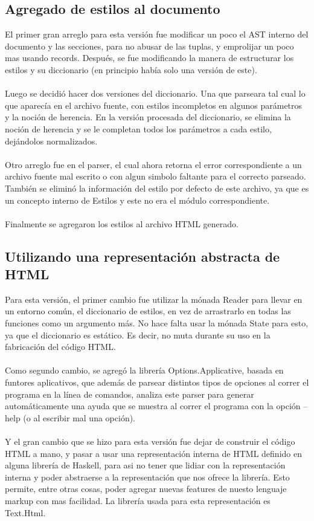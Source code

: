 \documentclass{article}
\begin{document}
\subsection{Agregado de estilos al documento}
El primer gran arreglo para esta versión fue modificar un poco el AST interno del documento y las secciones, para no abusar de las tuplas, y emprolijar un poco mas usando records. Después, se fue modificando la manera de estructurar los estilos y su diccionario (en principio había solo una versión de este).
\\~\\
Luego se decidió hacer dos versiones del diccionario. Una que parseara tal cual lo que aparecía en el archivo fuente, con estilos incompletos en algunos parámetros y la noción de herencia. En la versión procesada del diccionario, se elimina la noción de herencia y se le completan todos los parámetros a cada estilo, dejándolos normalizados.
\\~\\
Otro arreglo fue en el parser, el cual ahora retorna el error correspondiente a un archivo fuente mal escrito o con algun simbolo faltante para el correcto parseado. También se eliminó la información del estilo por defecto de este archivo, ya que es un concepto interno de Estilos y este no era el módulo correspondiente.
\\~\\
Finalmente se agregaron los estilos al archivo HTML generado.

\subsection{Utilizando una representación abstracta de HTML}

Para esta versión, el primer cambio fue utilizar la mónada Reader para llevar en un entorno común, el diccionario de estilos, en vez de arrastrarlo en todas las funciones como un argumento más. No hace falta usar la mónada State para esto, ya que el diccionario es estático. Es decir, no muta durante su uso en la fabricación del código HTML.
\\~\\
Como segundo cambio, se agregó la librería Options.Applicative, basada en funtores aplicativos, que además de parsear distintos tipos de opciones al correr el programa en la línea de comandos, analiza este parser para generar automáticamente una ayuda que se muestra al correr el programa con la opción --help (o al escribir mal una opción).
\\~\\
Y el gran cambio que se hizo para esta versión fue dejar de construir el código HTML a mano, y pasar a usar una representación interna de HTML definido en alguna librería de Haskell, para asi no tener que lidiar con la representación interna y poder abstraerse a la representación que nos ofrece la librería. Esto permite, entre otras cosas, poder agregar nuevas features de nuesto lenguaje markup con mas facilidad. La librería usada para esta representación es Text.Html.
\end{document}
